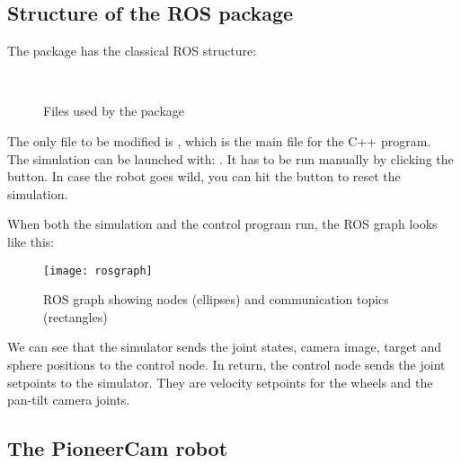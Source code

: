 \documentclass{ecnreport}
\begin{document}
\subsection{Structure of the  ROS package}

The package has the classical ROS structure:
\begin{figure}[h]
\begin{minipage}{.25\linewidth} ~ \end{minipage}
\begin{minipage}{.5\linewidth}
\end{minipage}
\caption{Files used by the package}
\end{figure}

The only file to be modified is , which is the main file for the C++ program. \\
The simulation can be launched with: . It has to be run manually by clicking the  button.
In case the robot goes wild, you can hit the  button to reset the simulation.

When both the simulation and the control program run, the ROS graph looks like this:

\begin{figure}[h!]\centering
 \texttt{[image: rosgraph]}
 \caption{ROS graph showing nodes (ellipses) and communication topics (rectangles)}
 \label{fig:rosgraph}
\end{figure}

We can see that the simulator sends the joint states, camera image, target and sphere positions to the control node. In return, the control node sends the joint setpoints
to the simulator. They are velocity setpoints for the wheels and the pan-tilt camera joints.\\


\subsection{The PioneerCam robot}
\end{document}
